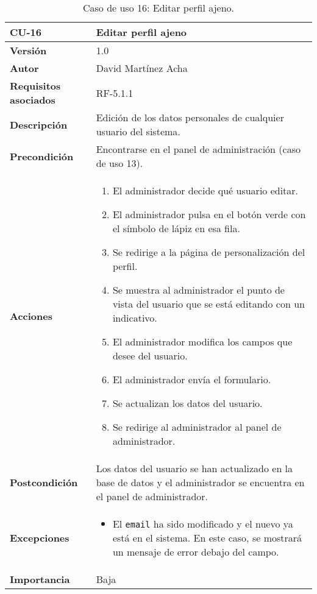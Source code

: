 \begin{table}[p]
	\centering
	\begin{tabularx}{\linewidth}{ p{} p{} }
		\toprule
		\textbf{CU-16}    & \textbf{Editar perfil ajeno}\\
		\toprule
		\textbf{Versión}              & 1.0    \\
		\textbf{Autor}                & David Martínez Acha \\
		\textbf{Requisitos asociados} & RF-5.1.1 \\
		\textbf{Descripción}          & Edición de los datos personales de cualquier usuario del sistema. \\
		\textbf{Precondición}         & Encontrarse en el panel de administración (caso de uso 13). \\
		\textbf{Acciones}             &
		\begin{enumerate}
			\def\labelenumi{\arabic{enumi}.}
			\tightlist
			\item El administrador decide qué usuario editar.
			\item El administrador pulsa en el botón verde con el símbolo de lápiz en esa fila.
			\item Se redirige a la página de personalización del perfil.
			\item Se muestra al administrador el punto de vista del usuario que se está editando con un indicativo.
			\item El administrador modifica los campos que desee del usuario.
			\item El administrador envía el formulario.
			\item Se actualizan los datos del usuario.
			\item Se redirige al administrador al panel de administrador.
		\end{enumerate}\\
		\textbf{Postcondición}        & Los datos del usuario se han actualizado en la base de datos y el administrador se encuentra en el panel de administrador. \\
		\textbf{Excepciones}          & \begin{itemize}
			\item El \texttt{email} ha sido modificado y el nuevo ya está en el sistema. En este caso, se mostrará un mensaje de error debajo del campo.
		\end{itemize}\\
		\textbf{Importancia}          & Baja \\
		\bottomrule
	\end{tabularx}
	\caption{Caso de uso 16: Editar perfil ajeno.}
\end{table}

